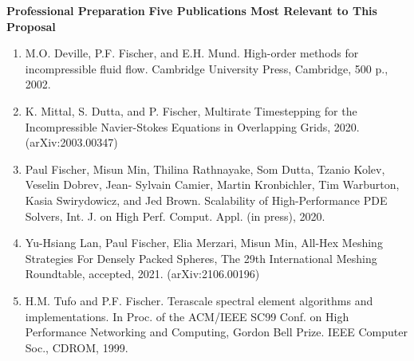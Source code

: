 \documentclass[11pt,letterpaper,english]{article}
\begin{document}
\begin{flushleft} {\bf Professional Preparation}
\vspace{.04in}
{\bf Five Publications Most Relevant to This Proposal}
\vspace{-6pt}
\begin{enumerate} \itemsep1pt \parskip0pt 
 \item M.O. Deville, P.F. Fischer, and E.H. Mund. High-order methods for incompressible fluid flow.
  Cambridge University Press, Cambridge, 500 p., 2002. \\
 \item K. Mittal, S. Dutta, and P. Fischer, Multirate Timestepping for the Incompressible Navier-Stokes
  Equations in Overlapping Grids, 2020. (arXiv:2003.00347) \\
 \item Paul Fischer, Misun Min, Thilina Rathnayake, Som Dutta, Tzanio Kolev, Veselin Dobrev, Jean-
  Sylvain Camier, Martin Kronbichler, Tim Warburton, Kasia Swirydowicz, and Jed Brown. Scalability
  of High-Performance PDE Solvers, Int. J. on High Perf. Comput. Appl. (in press), 2020. \\
 \item Yu-Hsiang Lan, Paul Fischer, Elia Merzari, Misun Min,
       All-Hex Meshing Strategies For Densely Packed Spheres,
       The 29th International Meshing Roundtable, accepted, 2021. (arXiv:2106.00196)\\ 
 \item H.M. Tufo and P.F. Fischer. Terascale spectral element algorithms and implementations. In Proc.
of the ACM/IEEE SC99 Conf. on High Performance Networking and Computing, Gordon Bell
Prize. IEEE Computer Soc., CDROM, 1999. \\
\end{enumerate}


\end{flushleft}
\end{document}
